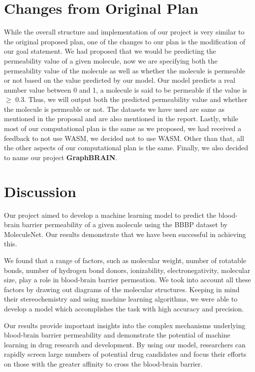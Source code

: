 \documentclass[fontsize=11pt]{article}
\begin{document}
\section*{Changes from Original Plan}

While the overall structure and implementation of our project is very similar to the original proposed plan, one of the changes to our plan is the modification of our goal statement. We had proposed that we would be predicting the permeability value of a given molecule, now we are specifying both the permeability value of the molecule as well as whether the molecule is permeable or not based on the value predicted by our model. Our model predicts a real number value between 0 and 1, a molecule is said to be permeable if the value is $\geq$ 0.3. Thus, we will output both the predicted permeability value and whether the molecule is permeable or not. The datasets we have used are same as mentioned in the proposal and are also mentioned in the report. Lastly, while most of our computational plan is the same as we proposed, we had received a feedback to not use WASM, we decided not to use WASM. Other than that, all the other aspects of our computational plan is the same. Finally, we also decided to name our project \textbf{GraphBRAIN}.

\section*{Discussion}

Our project aimed to develop a machine learning model to predict the blood-brain barrier permeability of a given molecule using the BBBP dataset by MoleculeNet. Our results demonstrate that we have been successful in achieving this.

We found that a range of factors, such as molecular weight, number of rotatable bonds, number of hydrogen bond donors, ionizability, electronegativity, molecular size, play a role in blood-brain barrier permeation. We took into account all these factors by drawing out diagrams of the molecular structures. Keeping in mind their stereochemistry and using machine learning algorithms, we were able to develop a model which accomplishes the task with high accuracy and precision.

Our results provide important insights into the complex mechanisms underlying blood-brain barrier permeability and demonstrate the potential of machine learning in drug research and development. By using our model, researchers can rapidly screen large numbers of potential drug candidates and focus their efforts on those with the greater affinity to cross the blood-brain barrier.
\end{document}
